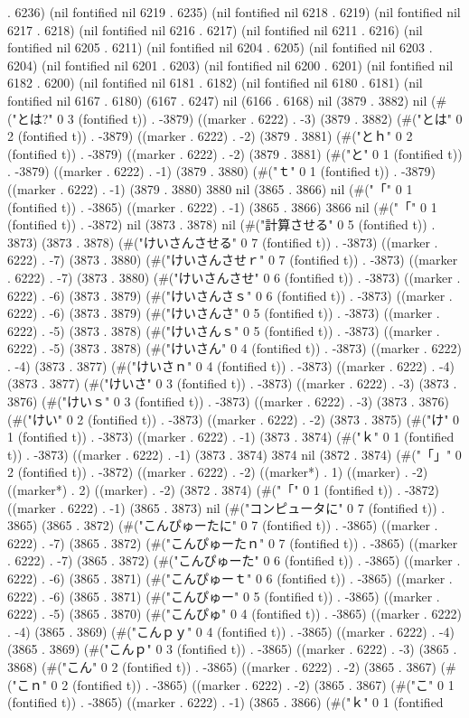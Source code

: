 . 6236) (nil fontified nil 6219 . 6235) (nil fontified nil 6218 . 6219) (nil fontified nil 6217 . 6218) (nil fontified nil 6216 . 6217) (nil fontified nil 6211 . 6216) (nil fontified nil 6205 . 6211) (nil fontified nil 6204 . 6205) (nil fontified nil 6203 . 6204) (nil fontified nil 6201 . 6203) (nil fontified nil 6200 . 6201) (nil fontified nil 6182 . 6200) (nil fontified nil 6181 . 6182) (nil fontified nil 6180 . 6181) (nil fontified nil 6167 . 6180) (6167 . 6247) nil (6166 . 6168) nil (3879 . 3882) nil (#("とは?" 0 3 (fontified t)) . -3879) ((marker . 6222) . -3) (3879 . 3882) (#("とは" 0 2 (fontified t)) . -3879) ((marker . 6222) . -2) (3879 . 3881) (#("とｈ" 0 2 (fontified t)) . -3879) ((marker . 6222) . -2) (3879 . 3881) (#("と" 0 1 (fontified t)) . -3879) ((marker . 6222) . -1) (3879 . 3880) (#("ｔ" 0 1 (fontified t)) . -3879) ((marker . 6222) . -1) (3879 . 3880) 3880 nil (3865 . 3866) nil (#("「" 0 1 (fontified t)) . -3865) ((marker . 6222) . -1) (3865 . 3866) 3866 nil (#("「" 0 1 (fontified t)) . -3872) nil (3873 . 3878) nil (#("計算させる" 0 5 (fontified t)) . 3873) (3873 . 3878) (#("けいさんさせる" 0 7 (fontified t)) . -3873) ((marker . 6222) . -7) (3873 . 3880) (#("けいさんさせｒ" 0 7 (fontified t)) . -3873) ((marker . 6222) . -7) (3873 . 3880) (#("けいさんさせ" 0 6 (fontified t)) . -3873) ((marker . 6222) . -6) (3873 . 3879) (#("けいさんさｓ" 0 6 (fontified t)) . -3873) ((marker . 6222) . -6) (3873 . 3879) (#("けいさんさ" 0 5 (fontified t)) . -3873) ((marker . 6222) . -5) (3873 . 3878) (#("けいさんｓ" 0 5 (fontified t)) . -3873) ((marker . 6222) . -5) (3873 . 3878) (#("けいさん" 0 4 (fontified t)) . -3873) ((marker . 6222) . -4) (3873 . 3877) (#("けいさｎ" 0 4 (fontified t)) . -3873) ((marker . 6222) . -4) (3873 . 3877) (#("けいさ" 0 3 (fontified t)) . -3873) ((marker . 6222) . -3) (3873 . 3876) (#("けいｓ" 0 3 (fontified t)) . -3873) ((marker . 6222) . -3) (3873 . 3876) (#("けい" 0 2 (fontified t)) . -3873) ((marker . 6222) . -2) (3873 . 3875) (#("け" 0 1 (fontified t)) . -3873) ((marker . 6222) . -1) (3873 . 3874) (#("ｋ" 0 1 (fontified t)) . -3873) ((marker . 6222) . -1) (3873 . 3874) 3874 nil (3872 . 3874) (#("「」" 0 2 (fontified t)) . -3872) ((marker . 6222) . -2) ((marker*) . 1) ((marker) . -2) ((marker*) . 2) ((marker) . -2) (3872 . 3874) (#("「" 0 1 (fontified t)) . -3872) ((marker . 6222) . -1) (3865 . 3873) nil (#("コンピュータに" 0 7 (fontified t)) . 3865) (3865 . 3872) (#("こんぴゅーたに" 0 7 (fontified t)) . -3865) ((marker . 6222) . -7) (3865 . 3872) (#("こんぴゅーたｎ" 0 7 (fontified t)) . -3865) ((marker . 6222) . -7) (3865 . 3872) (#("こんぴゅーた" 0 6 (fontified t)) . -3865) ((marker . 6222) . -6) (3865 . 3871) (#("こんぴゅーｔ" 0 6 (fontified t)) . -3865) ((marker . 6222) . -6) (3865 . 3871) (#("こんぴゅー" 0 5 (fontified t)) . -3865) ((marker . 6222) . -5) (3865 . 3870) (#("こんぴゅ" 0 4 (fontified t)) . -3865) ((marker . 6222) . -4) (3865 . 3869) (#("こんｐｙ" 0 4 (fontified t)) . -3865) ((marker . 6222) . -4) (3865 . 3869) (#("こんｐ" 0 3 (fontified t)) . -3865) ((marker . 6222) . -3) (3865 . 3868) (#("こん" 0 2 (fontified t)) . -3865) ((marker . 6222) . -2) (3865 . 3867) (#("こｎ" 0 2 (fontified t)) . -3865) ((marker . 6222) . -2) (3865 . 3867) (#("こ" 0 1 (fontified t)) . -3865) ((marker . 6222) . -1) (3865 . 3866) (#("ｋ" 0 1 (fontified 